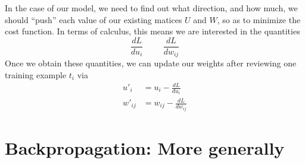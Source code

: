 \documentclass[12pt,letterpaper]{book}
\theoremstyle{definition}
\begin{document}
  In the case of our model, we need to find out what direction, and how much, we should ``push'' each 
  value of our existing matices $U$ and $W$, so as to minimize the cost function. 
  In terms of calculus, this means we are interested in the quantities 
  \[
      \frac{dL}{du_i} \hspace{1cm} \frac{dL}{dw_{ij}}
  \]
  Once we obtain these quantities, we can update our weights after reviewing one training
  example $t_i$ via
  \begin{align}
    u'_i &= u_i - \frac{dL}{du_i} \\
    w'_{ij}  &= w_{ij} - \frac{dL}{dw_{ij}}
  \end{align}

  

  
  \section{Backpropagation: More generally}
\end{document}
